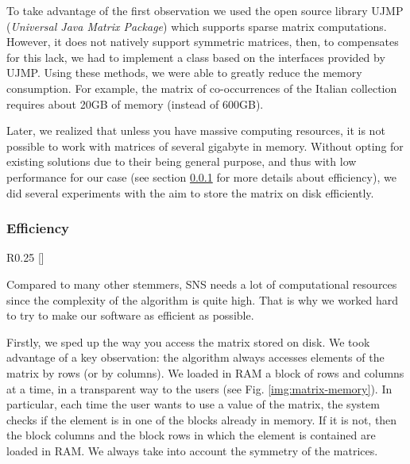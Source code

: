             To take advantage of the first observation we used the open source library UJMP (\emph{Universal Java Matrix Package})\footnotemark{} which supports sparse matrix computations. However, it does not natively support symmetric matrices, then, to compensates for this lack, we had to implement a class based on the interfaces provided by UJMP. Using these methods, we were able to greatly reduce the memory consumption. For example, the matrix of co-occurrences of the Italian collection requires about 20GB of memory (instead of 600GB).

            Later, we realized that unless you have massive computing resources, it is not possible to work with matrices of several gigabyte in memory. Without opting for existing solutions due to their being general purpose, and thus with low performance for our case (see section \ref{sec:efficiency} for more details about efficiency), we did several experiments with the aim to store the matrix on disk efficiently.


        \subsubsection{Efficiency}\label{sec:efficiency}

            \begin{wrapfigure}{R}{0.25\textwidth}
                \centering
                \raisebox{0pt}[\dimexpr{}\baselineskip\relax]{}                
                \caption{\label{img:matrix-memory}Matrix on disk}
            \end{wrapfigure}

            Compared to many other stemmers, SNS needs a lot of computational resources since the complexity of the algorithm is quite high. That is why we worked hard to try to make our software as efficient as possible.
            
            Firstly, we sped up the way you access the matrix stored on disk. We took advantage of a key observation: the algorithm always accesses elements of the matrix by rows (or by columns). We loaded in RAM a block of rows and columns at a time, in a transparent way to the users (see Fig. \ref{img:matrix-memory}). In particular, each time the user wants to use a value of the matrix, the system checks if the element is in one of the blocks already in memory. If it is not, then the block columns and the block rows in which the element is contained are loaded in RAM. We always take into account the symmetry of the matrices.

